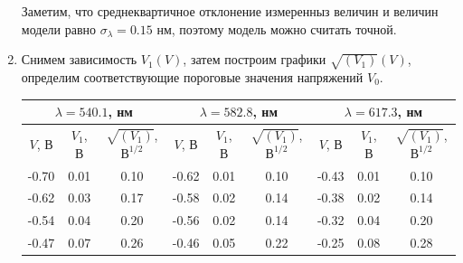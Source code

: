 \begin{enumerate}
        Заметим, что среднеквартичное отклонение измеренныз величин и величин модели равно $\sigma_{\lambda} = 0.15$ нм, поэтому модель можно считать точной.

        \item Снимем зависимость $V_1(V)$, затем построим графики $\sqrt{(V_1)}(V)$, определим соответствующие пороговые значения напряжений $V_0$.
        
        \begin{table}[H]
            \centering
            \begin{tabular}{|ccc|ccc|ccc|}
                \hline
                \multicolumn{3}{|c|}{$\lambda = 540.1$, нм}                                                     & \multicolumn{3}{c|}{$\lambda = 582.8$, нм}                                                     & \multicolumn{3}{c|}{$\lambda = 617.3$, нм}                                                     \\ \hline
                \multicolumn{1}{|c|}{$V$, В} & \multicolumn{1}{c|}{$V_1$, В} & $\sqrt{(V_1)}$, $\text{В}^{1/2}$ & \multicolumn{1}{c|}{$V$, В} & \multicolumn{1}{c|}{$V_1$, В} & $\sqrt{(V_1)}$, $\text{В}^{1/2}$ & \multicolumn{1}{c|}{$V$, В} & \multicolumn{1}{c|}{$V_1$, В} & $\sqrt{(V_1)}$, $\text{В}^{1/2}$ \\ \hline
                \multicolumn{1}{|c|}{-0.70}  & \multicolumn{1}{c|}{0.01}     & 0.10                             & \multicolumn{1}{c|}{-0.62}  & \multicolumn{1}{c|}{0.01}     & 0.10                             & \multicolumn{1}{c|}{-0.43}  & \multicolumn{1}{c|}{0.01}     & 0.10                             \\ \hline
                \multicolumn{1}{|c|}{-0.62}  & \multicolumn{1}{c|}{0.03}     & 0.17                             & \multicolumn{1}{c|}{-0.58}  & \multicolumn{1}{c|}{0.02}     & 0.14                             & \multicolumn{1}{c|}{-0.38}  & \multicolumn{1}{c|}{0.02}     & 0.14                             \\ \hline
                \multicolumn{1}{|c|}{-0.54}  & \multicolumn{1}{c|}{0.04}     & 0.20                             & \multicolumn{1}{c|}{-0.56}  & \multicolumn{1}{c|}{0.02}     & 0.14                             & \multicolumn{1}{c|}{-0.32}  & \multicolumn{1}{c|}{0.04}     & 0.20                             \\ \hline
                \multicolumn{1}{|c|}{-0.47}  & \multicolumn{1}{c|}{0.07}     & 0.26                             & \multicolumn{1}{c|}{-0.46}  & \multicolumn{1}{c|}{0.05}     & 0.22                             & \multicolumn{1}{c|}{-0.25}  & \multicolumn{1}{c|}{0.08}     & 0.28                             \\ \hline

\end{tabular}
\end{table}
\end{enumerate}
